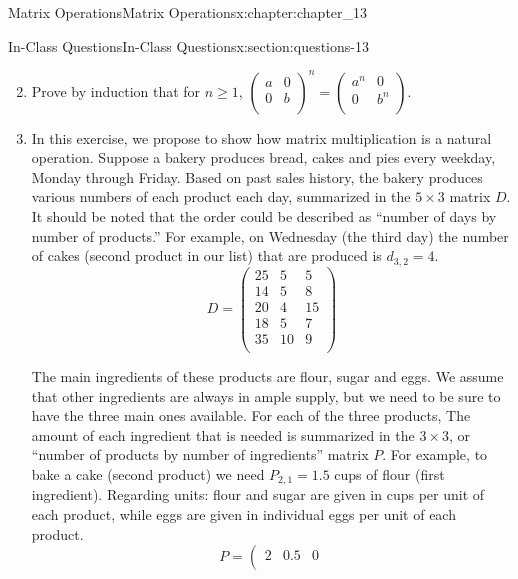 \documentclass[oneside,10pt,]{book}
\numberwithin{equation}{section}
\begin{document}
\begin{chapterptx}{Matrix Operations}{}{Matrix Operations}{}{}{x:chapter:chapter_13}
\begin{sectionptx}{In-Class Questions}{}{In-Class Questions}{}{}{x:section:questions-13}
\begin{enumerate}[label=\arabic*.]
\begin{multicols}{2}
\begin{enumerate}[label=(\alph*)]
\end{enumerate}
\end{multicols}
%
\item{}Prove by induction that for \(n \geq 1\), \(\left(
\begin{array}{cc}
a & 0 \\
0 & b \\
\end{array}
\right)^n= \left(
\begin{array}{cc}
a^n & 0 \\
0 & b^n \\
\end{array}
\right)\).%
\item{}In this exercise, we propose to show how matrix multiplication is a natural operation.  Suppose a bakery produces bread, cakes and pies every weekday, Monday through Friday. Based on past sales history, the bakery produces various numbers of each product each day, summarized in the \(5 \times 3\) matrix \(D\).  It should be noted that the order could be described as ``number of days by number of products.''   For example, on Wednesday (the third day) the number of cakes (second product in our list) that are produced  is  \(d_{3,2} = 4\).%
\begin{equation*}
D =\left(
\begin{array}{ccc}
25 & 5 & 5 \\
14 & 5 & 8 \\
20 & 4 & 15 \\
18 & 5 & 7 \\
35 & 10 & 9 \\
\end{array}
\right)
\end{equation*}
%
\par
The main ingredients of these products are flour, sugar and eggs. We assume that other ingredients are always in ample supply, but we need to be sure to have the three main ones available.   For each of the three products, The amount of each ingredient that is needed is summarized in the \(3 \times 3\), or ``number of products by number of ingredients'' matrix \(P\).  For example, to bake a cake (second product) we need \(P_{2,1}=1.5\) cups of flour (first ingredient).  Regarding units: flour and sugar are given in cups per unit of each product, while eggs are given in individual eggs per unit of each product.%
\begin{equation*}
P =\left(
\begin{array}{ccc}
2 & 0.5 & 0 \\

\end{array}
\end{equation*}
\end{enumerate}
\end{sectionptx}
\end{chapterptx}
\end{document}
